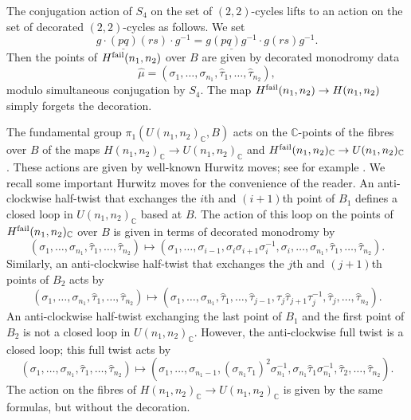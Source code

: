 \documentclass{amsart}
\numberwithin{equation}{section} \numberwithin{figure}{section}
\newcommand\CC{\mathbb{C}}
\theoremstyle{one}
\theoremstyle{definition}
\begin{document}
The conjugation action of \(S_4\) on the set of \((2,2)\)-cycles lifts to an action on the set of decorated \((2,2)\)-cycles as follows.
We set
\[ g \cdot \underline{(pq)}(rs) \cdot g^{-1} = \underline{g(pq)g^{-1}} \cdot {g(rs)g^{-1}}.\]
Then the points of \(H^{\rm fail}(n_1,n_2)\) over \(B\) are given by decorated monodromy data \[\hat{\mu} = (\sigma_1, \dots, \sigma_{n_1}, \hat{\tau}_1, \dots, \hat{\tau}_{n_2}),\] modulo simultaneous conjugation by \(S_4\).  
The map \(H^{\rm fail}(n_1,n_2) \to H(n_1,n_2)\) simply forgets the decoration.

The fundamental group \(\pi_1(U(n_1,n_2)_{\CC}, B)\) acts on the \(\CC\)-points of the fibres over \(B\) of the maps \(H(n_1,n_2)_{\CC} \to U(n_1,n_2)_{\CC}\) and \(H^{\rm fail}(n_1,n_2)_{\CC} \to U(n_1,n_2)_{\CC}\).
These actions are given by well-known Hurwitz moves; see for example \cite[\S1.5]{ful:69}.
We recall some important Hurwitz moves for the convenience of the reader.
An anti-clockwise half-twist that exchanges the \(i\)th and \((i+1)\)th point of \(B_1\) defines a closed loop in $U(n_1,n_2)_\CC$ based at $B$.
The action of this loop on the points of \(H^{\rm fail}(n_1,n_2)_{\CC}\) over \(B\) is given in terms of decorated monodromy by
\begin{equation}\label{eqn:halftwist1}
  (\sigma_1,\dots, \sigma_{n_1}, \hat{\tau}_1,\dots, \hat{\tau}_{n_2}) \mapsto (\sigma_1,\dots,\sigma_{i-1}, \sigma_{i}\sigma_{i+1}\sigma_{i}^{-1}, \sigma_i,\dots, \sigma_{n_1}, \hat{\tau}_1,\dots, \hat{\tau}_{n_2}).
\end{equation}
Similarly, an anti-clockwise half-twist that exchanges the \(j\)th and \((j+1)\)th points of \(B_2\) acts by
\begin{equation}\label{eqn:halftwist2}
  (\sigma_1,\dots, \sigma_{n_1}, \hat{\tau}_1,\dots, \hat{\tau}_{n_2}) \mapsto (\sigma_1,\dots, \sigma_{n_1}, \hat{\tau}_1,\dots,\hat{\tau}_{j-1} ,\tau_{j}\hat{\tau}_{j+1}\tau_{j}^{-1}, \hat{\tau}_j,\dots, \hat{\tau}_{n_2}).
\end{equation}
An anti-clockwise half-twist exchanging the last point of $B_1$ and the first point of $B_2$ is not a closed loop in $U(n_1,n_2)_{\CC}$. However, the anti-clockwise full twist is a closed loop; this full twist acts by
\begin{equation}\label{eqn:fulltwist}
  (\sigma_1,\dots, \sigma_{n_1}, \hat{\tau}_1,\dots, \hat{\tau}_{n_2}) \mapsto
(\sigma_1,\dots, \sigma_{n_1-1}, (\sigma_{n_1}\tau_1)^{2}\sigma^{-1}_{n_1},\sigma_{n_1}\hat{\tau}_1 \sigma^{-1}_{n_1}, \hat{\tau}_2,\dots, \hat{\tau}_{n_2}).
\end{equation}
The action on the fibres of \(H(n_1,n_2)_{\CC} \to U(n_1,n_2)_{\CC}\) is given by the same formulas, but without the decoration.
\end{document}
